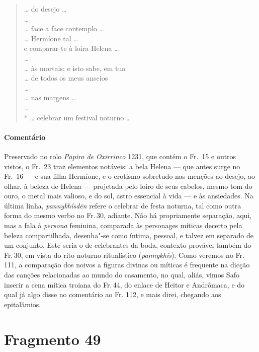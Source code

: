 {\begin{verse}
\ldots{} do desejo \ldots{}\\
\ldots{}\\
\ldots{} face a face contemplo \ldots{}\\
\ldots{} Hermíone tal \ldots{}\\
e comparar-te à loira Helena \ldots{}\\
\ldots{}\\
\ldots{} às mortais; e isto sabe, em tua\\
\ldots{} de todos os meus anseios\\
\ldots{}\\
\ldots{} nas margens \ldots{}\\
\ldots{}\\*
\ldots{} celebrar um festival noturno \ldots{} 
\end{verse}

\pagebreak

{\paragraph{Comentário} Preservado no rolo \textit{Papiro de Oxirrinco} 1231, que contém o Fr.~15 e outros vistos, o Fr.~23 traz elementos notáveis: a bela Helena --- que antes surge no Fr.~16 --- e sua filha Hermíone, e o erotismo sobretudo nas menções ao desejo, ao olhar, à beleza de Helena --- projetada pelo loiro de seus cabelos, mesmo tom do ouro, o metal mais valioso, e do sol, astro essencial à vida --- e às ansiedades. Na última linha, \textit{pannykhísdēn} refere o celebrar de festa noturna, tal como outra forma do mesmo verbo no Fr.\,30, adiante. Não há propriamente separação, aqui, mas a fala à \textit{persona} feminina, comparada às personages míticas decerto pela beleza compartilhada, desenha"-se como íntima, pessoal, e talvez em separado de um conjunto. Este seria o de celebrantes da boda, contexto provável também do Fr.\,30, em vista do rito noturno ritualístico (\textit{pannykhís}). Como veremos no Fr.\,111, a comparação dos noivos a figuras divinas ou míticas é frequente na dicção das canções relacionadas ao mundo do casamento, no qual, aliás, vimos Safo inserir a cena mítica troiana do Fr.\,44, do enlace de Heitor e Andrômaca, e do qual já algo disse no comentário ao Fr. 112, e mais direi, chegando aos epitalâmios.}

\pagebreak
\section{Fragmento 49}

}
